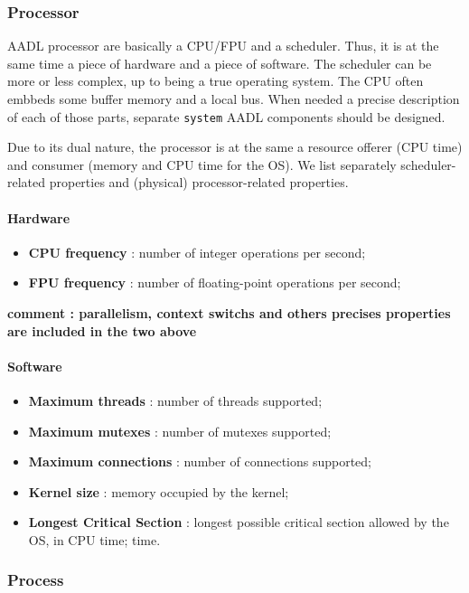\subsubsection {Processor}

AADL processor are basically a CPU/FPU and a scheduler. Thus, 
it is at the same time a piece of hardware and a piece of 
software. The scheduler can be more or less complex, up to 
being a true operating system. The CPU often embbeds some 
buffer memory and a local bus. When needed a precise 
description of each of those parts, separate \texttt{system} 
AADL components should be designed. 

Due to its dual nature, the processor is at the same a 
resource offerer (CPU time) and consumer (memory and CPU 
time for the OS). We list separately scheduler-related 
properties and (physical) processor-related properties.

\paragraph{Hardware}
\begin{itemize}
\item \textbf{CPU frequency} : number of integer operations per second;
\item \textbf{FPU frequency} : number of floating-point operations per second;
\end{itemize}
\textbf{comment : parallelism, context switchs and others precises properties are included in the two above}

\paragraph{Software}
\begin{itemize}
\item \textbf{Maximum threads} : number of threads supported;
\item \textbf{Maximum mutexes} : number of mutexes supported;
\item \textbf{Maximum connections} : number of connections supported;
\item \textbf{Kernel size} : memory occupied by the kernel;
\item \textbf {Longest Critical Section} : longest possible critical 
section allowed by the OS, in CPU time;
time.
\end{itemize}

\subsubsection {Process}

